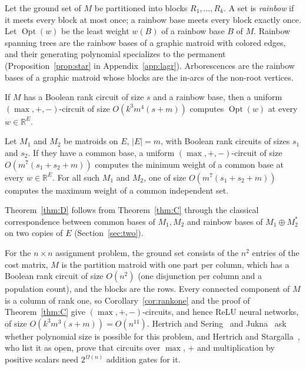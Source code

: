 \documentclass[runningheads,envcountsame]{llncs}
\newcommand{\R}{\mathbb R}
\newcommand{\Opt}{\operatorname{Opt}}
\begin{document}
Let the ground set of $M$ be partitioned into blocks $R_1,\ldots,R_k$.  A set is
\emph{rainbow} if it meets every block at most once; a rainbow base meets every
block exactly once.  Let $\Opt(w)$ be the least weight $w(B)$ of a rainbow base $B$
of $M$.  Rainbow spanning trees are the rainbow
bases of a graphic matroid with colored edges, and their generating polynomial
specializes to the permanent (Proposition~\ref{prop:star} in
Appendix~\ref{app:lagr}).  Arborescences are the rainbow bases of a graphic
matroid whose blocks are the in-arcs of the non-root vertices.

\begin{mainthm}
\label{thm:C}
If $M$ has a Boolean rank circuit of size $s$ and a rainbow base, then a uniform
$(\max,+,-)$-circuit of size $O(k^{3}m^{4}(s+m))$ computes $\Opt(w)$ at every
$w\in\R^{E}$.
\end{mainthm}

\begin{mainthm}
\label{thm:D}
Let $M_1$ and $M_2$ be matroids on $E$, $|E|=m$, with Boolean rank circuits of
sizes $s_1$ and $s_2$.  If they have a common base, a uniform
$(\max,+,-)$-circuit of size $O(m^{7}(s_1+s_2+m))$ computes the minimum weight of
a common base at every $w\in\R^{E}$.  For all such $M_1$ and $M_2$, one of size
$O(m^{7}(s_1+s_2+m))$ computes the maximum weight of a common independent set.
\end{mainthm}

Theorem~\ref{thm:D} follows from Theorem~\ref{thm:C} through the classical
correspondence between common bases of $M_1,M_2$ and rainbow bases of
$M_1\oplus M_2^{*}$ on two copies of $E$ (Section~\ref{sec:two}).

For the $n\times n$ assignment problem, the ground set consists of the $n^{2}$
entries of the cost matrix, $M$ is the partition matroid with one part per
column, which has a Boolean rank circuit of size $O(n^{2})$ (one disjunction per
column and a population count), and the blocks are the rows.  Every connected
component of $M$ is a column of rank one, so Corollary~\ref{cor:rankone} and the
proof of Theorem~\ref{thm:C} give $(\max,+,-)$-circuits, and hence ReLU neural
networks, of size $O(k^{3}m^{3}(s+m))=O(n^{11})$.  Hertrich and
Sering~\cite{hertrich-sering25} and
Jukna~\cite[Section~6.5, Problem~3]{jukna23-tropical} ask whether polynomial
size is possible for this problem, and Hertrich and
Stargalla~\cite{hertrich-stargalla26}, who list it as open, prove that circuits
over $\max$, $+$ and multiplication by positive scalars need $2^{\Omega(n)}$
addition gates for it.
\end{document}
